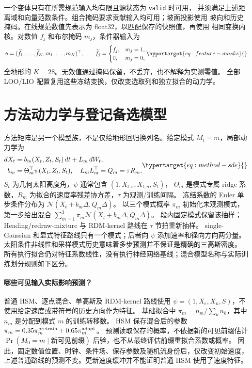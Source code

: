 一个变体只有在所需规范输入均有限且源状态为 \texttt{valid} 时可用，
并须满足上述距离域和向量范数条件。组合掩码要求贡献输入均可用；坡面投影使用
坡向和历史掩码。在线规范数值先表示为 float32，以匹配保存的快照值，再使用
相同变换内核。对数值 \(f_j\) 和布尔掩码 \(m_j\)，条件器输入为
\begin{equation}
\phi=(\widetilde f_1,\ldots,\widetilde f_K,m_1,\ldots,m_K)^\top,
\qquad \widetilde f_j=
\begin{cases}f_j,&m_j=1,\\0,&m_j=0,\end{cases}
\label{eq:feature-masks}\hypertarget{eq:feature-masks}{}
\end{equation}
全地形的 \(K=28\)。无效值通过掩码保留，不丢弃，也不解释为实测零值。
全部 LOO/LIO 配置复用这些冻结变换，仅改变选取列和独立拟合的动力学。


\section{方法动力学与登记备选模型}
\label{sec:method-model}\hypertarget{sec:method-model}{}
方法矩阵是另一个模型族，不是仅给地形回归换列名。给定模式 \(M_t=m\)，局部动力学为
\begin{equation}
\begin{aligned}
dX_t&=b_m(X_t,Z_t,S_t)\,dt+L_m\,dW_t,\\
b_m&=\Theta_m^\top\psi(X_t,Z_t,S_t),\quad L_mL_m^\top=Q_m=\tau R_m.
\end{aligned}
\label{eq:method-sde}\hypertarget{eq:method-sde}{}
\end{equation}
\(S_t\) 为几何太阳高度角，\(\psi\) 通常包含 \((1,X_{t,e},X_{t,n},S_t)\)，
\(\Theta_m\) 是模式专属 ridge 系数，\(R_m\) 为拟合的速度率残差协方差，\(\tau\) 为观测/训练间隔。
冻结系数的 Euler 单步条件分布为 \(\mathcal N(X_t+b_m\Delta,Q_m\Delta)\)。
以三个模式概率 \(\pi_m\) 初始化未观测模式，第一步给出混合
\(\sum_{m=1}^3\pi_m\mathcal N(X_t+b_m\Delta,Q_m\Delta)\)。
段内固定模式保留该抽样；Heading/redraw-mixture 与 RDM-kernel 路线在 \(\tau\) 节拍重新抽样。
single-Gaussian 和显式特征路线只有一个模式；后者向 \(\psi\) 添加速率和径向方向两分量。
太阳条件非线性和采样模式历史意味着多步预测并不保证是精确的三高斯密度。
所有执行拟合仍对特征系数线性，没有执行神经网络基线；混合模型名称与实际训练划分规则如下区分。

\paragraph{哪些可见输入实际影响预测？}
普通 HSM、逐点混合、单高斯及 RDM-kernel 路线使用
\(\psi=(1,X_e,X_n,S)\)，不使用给定速度或带符号的历史方向作为特征。
基础拟合中 \(\pi_m=n_m/\sum_k n_k\)，其中 \(n_m\) 是分配到模式 \(m\) 的训练转移数。
HSM 保存混合后的参数
\(\pi_m=0.35\pi_m^{\rm pretrain}+0.65\pi_m^{\rm adapt}\)。
预测读取保存的概率，不依据新的可见前缀估计
\(\Pr(M_0=m\mid\text{新可见前缀})\) 后验，也不从最终评估前缀重拟合系数或概率。
因此，固定数值位置、时钟、条件场、保存参数及随机流身份后，仅改变初始速度，
上述普通路线的预测不变。更新速度缓冲并不能证明普通 HSM 使用了速度特征。

